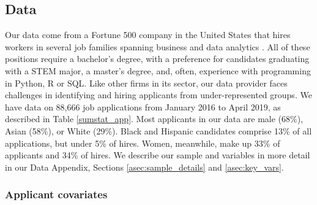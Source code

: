 \documentclass[crop,noquery,editorname,historyrev,nosurname,runningno,sepcount]{RESTUD}
\begin{document}
\subsection{Data}

Our data come from a Fortune 500 company in the United States that hires workers in several job families spanning business and data analytics \citep{anonymousfirmPersonnelRecords2019}.  All of these positions require a bachelor's degree, with a preference for candidates graduating with a STEM major, a master's degree, and, often, experience with programming in Python, R or SQL.  Like other firms in its sector, our data provider faces challenges in identifying and hiring applicants from under-represented groups.  We have data on 88,666 job applications from January 2016 to April 2019, as described in Table \ref{sumstat_app}.   Most applicants in our data are male (68\%), Asian (58\%), or White (29\%). Black and Hispanic candidates comprise 13\% of all applications, but under 5\% of hires.  Women, meanwhile, make up 33\% of applicants and 34\% of hires. We describe our sample and variables in more detail in our Data Appendix, Sections \ref{asec:sample_details} and \ref{asec:key_vars}. 


\begin{table}
\end{table}

\subsubsection{Applicant covariates}
\end{document}
